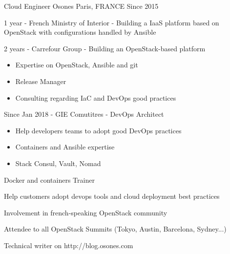 

\begin{cventries}

  \cventry
    {Cloud Engineer} %
    {Osones} %
    {Paris, FRANCE} %
    {Since 2015} %
    {
      \begin{cvitems} %
        \item {1 year - French Ministry of Interior - Building a IaaS
          platform based on OpenStack with configurations handled by Ansible}
        \item {2 years - Carrefour Group - Building an OpenStack-based platform}
          \begin{itemize}
            \item {Expertise on OpenStack, Ansible and git}
            \item {Release Manager}
            \item {Consulting regarding IaC and DevOps good practices}
          \end{itemize}
        \item {Since Jan 2018 - GIE Comutitres - DevOps Architect}
          \begin{itemize}
            \item {Help developers teams to adopt good DevOps practices}
            \item {Containers and Ansible expertise}
            \item {Stack Consul, Vault, Nomad}
          \end{itemize}
      \item {Docker and containers Trainer}
      \item {Help customers adopt devops tools and cloud deployment best
        practices}
      \item {Involvement in french-speaking OpenStack community}
      \item {Attendee to all OpenStack Summits (Tokyo, Austin, Barcelona, Sydney...)}
      \item {Technical writer on http://blog.osones.com}
      \end{cvitems}
    }


\end{cventries}
